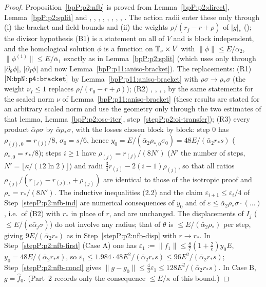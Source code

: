 \begin{proof}
\label{stepP:p11:aa-same} Proposition~\ref{bpP:p2:nfb} is proved from Lemma~\ref{bpP:p2:direct}, Lemma~\ref{bpP:p2:split} and , , , , , , , , . The action radii enter these only through (i) the bracket and field bounds and (ii) the weights $\rho/(r_j-r+\rho)$ of $\lvert g\rvert_*$ (); the divisor hypothesis (B1) is a statement on all of $V$ and is block independent, and the homological solution $\phi$ is a function on $\mathbb{T}_s\times V$ with $\lVert\phi\rVert\le E/\bar\alpha_2$, $\lVert\phi^{(1)}\rVert\le E/\bar\alpha_1$ exactly as in Lemma~\ref{bpP:p2:split} (which uses  only through $\lvert\partial_\theta\phi\rvert$, $\lvert\partial_I\phi\rvert$ and now Lemma~\ref{bpP:p11:aniso-bracket}). The replacements: (R1) $\textup{[N:\texttt{bpN:p4:bracket}]}$ by Lemma~\ref{bpP:p11:aniso-bracket} with $\rho\sigma\to\rho_*\sigma$ (the weight $\nu_I\le1$ replaces $\rho/(r_0-r+\rho)$); (R2) , , , ,  by the same statements for the scaled norm $\nu$ of Lemma~\ref{bpP:p11:aniso-bracket} (these results are stated for an arbitrary scaled norm and use the geometry only through the two estimates of that lemma, Lemma~\ref{bpP:p2:osc-iter}, step~\ref{stepP:p2:oi-transfer}); (R3) every product $\bar\alpha\rho\sigma$ by $\bar\alpha\rho_*\sigma$, with the losses chosen block by block: step $0$ has $\rho_{(j),0}=r_{(j)}/8$, $\sigma_0=s/6$, hence $y_0=E/(\bar\alpha_2\rho_{*,0}\sigma_0)=48E/(\bar\alpha_2r_*s)$ ($\rho_{*,0}=r_*/8$); steps $i\ge1$ have $\rho_{(j)}=r_{(j)}/(8N')$ ($N'$ the number of steps, $N'=\lfloor\kappa/(12\ln2)\rfloor$) and radii $\frac34r_{(j)}-2(i-1)\rho_{(j)}$, so that all ratios $\rho_{(j)}/(r_{(j)}-r_{(j),i}+\rho_{(j)})$ are identical to those of the isotropic proof and $\rho_*=r_*/(8N')$. The inductive inequalities (2.2) and the claim $\varepsilon_{i+1}\le\varepsilon_i/4$ of Step~\ref{stepP:p2:nfb-ind} are numerical consequences of $y_0$ and of $\varepsilon\le\bar\alpha_2\rho_*\sigma\cdot(\ldots)$, i.e.\ of (B2) with $r_*$ in place of $r$, and are unchanged. The displacements of $I_j$ ($\le E/(e\bar\alpha_j\sigma)$) do not involve any radius; that of $\theta$ is $\le E/(\bar\alpha_2\rho_*)$ per step, giving $9E/(\bar\alpha_2r_*)$ as in Step~\ref{stepP:p2:nfb-disp} with $r\to r_*$.
\label{stepP:p11:aa-quad} In Step~\ref{stepP:p2:nfb-first} (Case A) one has $\varepsilon_1:=\lVert f_1\rVert\le\frac87(1+\frac2e)y_0E$, $y_0=48E/(\bar\alpha_2r_*s)$, so $\varepsilon_1\le1.984\cdot48E^2/(\bar\alpha_2r_*s)\le96E^2/(\bar\alpha_2r_*s)$; Step~\ref{stepP:p2:nfb-concl} gives $\lVert g-g_0\rVert\le\frac43\varepsilon_1\le128E^2/(\bar\alpha_2r_*s)$. In Case B, $g=\hat f_0$. (Part~2 records only the consequence $\le E/\kappa$ of this bound.)
\end{proof}
